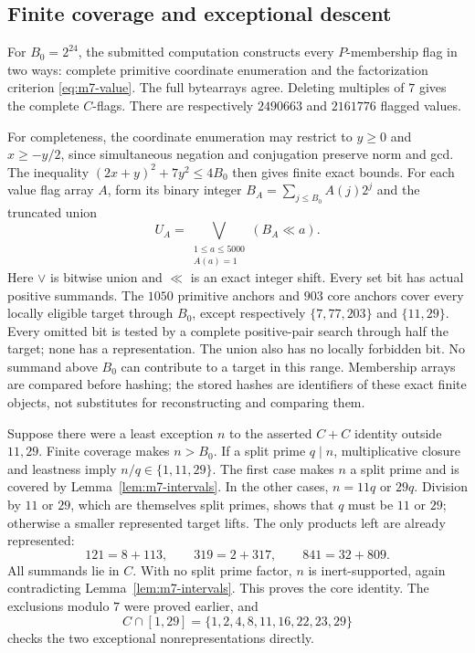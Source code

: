 \subsection{Finite coverage and exceptional descent}

For \(B_0=2^{24}\), the submitted computation constructs every
\(P\)-membership flag in two ways: complete primitive coordinate
enumeration and the factorization criterion \eqref{eq:m7-value}.
The full bytearrays agree. Deleting multiples of \(7\) gives the
complete \(C\)-flags. There are respectively \(2490663\) and
\(2161776\) flagged values.

For completeness, the coordinate enumeration may restrict to
\(y\ge0\) and \(x\ge-y/2\), since simultaneous negation and
conjugation preserve norm and gcd. The inequality
\((2x+y)^2+7y^2\le4B_0\) then gives finite exact bounds.
For each value flag array \(A\), form its binary integer
\(B_A=\sum_{j\le B_0}A(j)2^j\) and the truncated union
\[
       U_A=\bigvee_{\substack{1\le a\le5000\\A(a)=1}}(B_A\ll a).
\]
Here \(\vee\) is bitwise union and \(\ll\) is an exact integer
shift. Every set bit has actual positive summands.
The \(1050\) primitive anchors and \(903\) core anchors cover every
locally eligible target through \(B_0\), except respectively
\(\{7,77,203\}\) and \(\{11,29\}\).
Every omitted bit is tested by a complete positive-pair search
through half the target; none has a representation. The union
also has no locally forbidden bit. No summand above \(B_0\)
can contribute to a target in this range.
Membership arrays are compared before hashing; the stored hashes
are identifiers of these exact finite objects, not substitutes
for reconstructing and comparing them.

Suppose there were a least exception \(n\) to the asserted
\(C+C\) identity outside \(11,29\). Finite coverage makes
\(n>B_0\). If a split prime \(q\mid n\), multiplicative closure
and leastness imply \(n/q\in\{1,11,29\}\).
The first case makes \(n\) a split prime and is covered by
Lemma~\ref{lem:m7-intervals}. In the other cases,
\(n=11q\) or \(29q\). Division by \(11\) or \(29\), which are
themselves split primes, shows that \(q\) must be \(11\) or \(29\);
otherwise a smaller represented target lifts. The only products
left are already represented:
\[
                 121=8+113,\qquad
                 319=2+317,\qquad
                 841=32+809.
\]
All summands lie in \(C\). With no split prime factor, \(n\) is
inert-supported, again contradicting Lemma~\ref{lem:m7-intervals}.
This proves the core identity. The exclusions modulo \(7\)
were proved earlier, and
\[
                  C\cap[1,29]=
                  \{1,2,4,8,11,16,22,23,29\}
\]
checks the two exceptional nonrepresentations directly.

